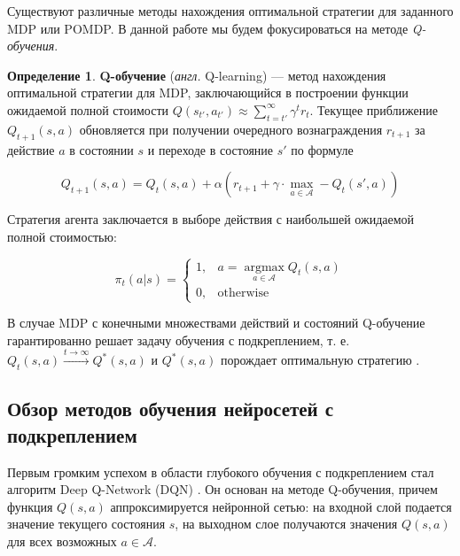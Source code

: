 \documentclass[specification,annotation,times]{itmo-student-thesis}
\DeclareMathOperator{\argmax}{argmax}
\theoremstyle{definition}
\newtheorem{definition-ru}{Определение}
\begin{document}
Существуют различные методы нахождения оптимальной стратегии для заданного MDP
или POMDP. В данной работе мы будем фокусироваться на методе \textit{Q-обучения}.

\begin{definition-ru}
  \textbf{Q-обучение} (\textit{англ.} Q-learning) \cite{q-learning-orig} ---
  метод нахождения оптимальной стратегии для MDP, заключающийся в построении
  функции ожидаемой полной стоимости
  $Q(s_{t'}, a_{t'}) \approx \sum\limits_{t=t'}^{\infty} \gamma^t r_t$. Текущее
  приближение $Q_{t+1}(s, a)$ обновляется при получении очередного
  вознаграждения $r_{t+1}$ за действие $a$ в состоянии $s$ и переходе в
  состояние $s'$ по формуле

  \begin{equation}\label{eq:q-learning}
    Q_{t+1}(s, a) = Q_t(s, a) + \alpha \left( r_{t+1} +
    \gamma \cdot \max\limits_{a \in \mathcal{A}} - Q_t(s', a) \right)
  \end{equation}

  Стратегия агента заключается в выборе действия с наибольшей ожидаемой полной
  стоимостью:

  \begin{equation}
    \pi_t(a | s) = \begin{cases}
      1, & a = \argmax\limits_{a \in \mathcal{A}} {Q_t(s, a)}\\
      0, & \text{otherwise}
    \end{cases}
  \end{equation}
\end{definition-ru}

В случае MDP с конечными множествами действий и состояний Q-обучение
гарантированно решает задачу обучения с подкреплением, т. е.
$Q_t(s, a) \xrightarrow{t \rightarrow \infty} Q^*(s, a)$ и $Q^*(s, a)$ порождает
оптимальную стратегию \cite{q-learning-orig}.

\subsection{Обзор методов обучения нейросетей с подкреплением}\label{overview:nns}

Первым громким успехом в области глубокого обучения с подкреплением стал
алгоритм Deep Q-Network (DQN) \cite{deepmind-dqn-orig}. Он основан на методе
Q-обучения, причем функция $Q(s, a)$ аппроксимируется нейронной сетью: на
входной слой подается значение текущего состояния $s$, на выходном слое
получаются значения $Q(s, a)$ для всех возможных $a \in \mathcal{A}$. 
\end{document}
